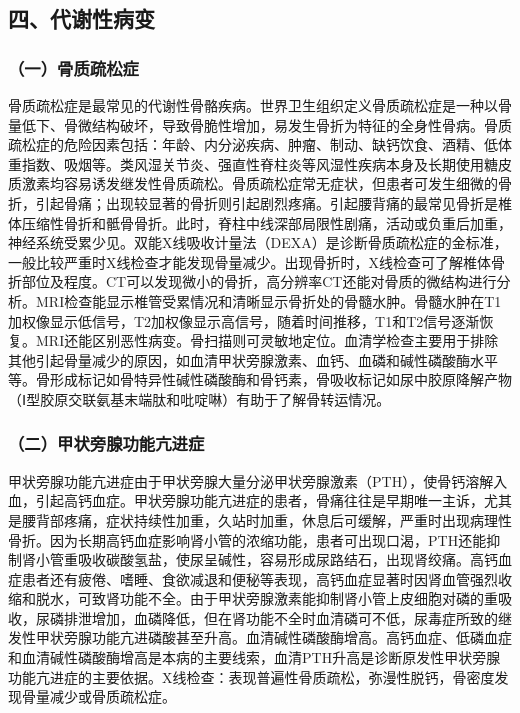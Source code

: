 \subsection{四、代谢性病变}

\subsubsection{（一）骨质疏松症}

骨质疏松症是最常见的代谢性骨骼疾病。世界卫生组织定义骨质疏松症是一种以骨量低下、骨微结构破坏，导致骨脆性增加，易发生骨折为特征的全身性骨病。骨质疏松症的危险因素包括：年龄、内分泌疾病、肿瘤、制动、缺钙饮食、酒精、低体重指数、吸烟等。类风湿关节炎、强直性脊柱炎等风湿性疾病本身及长期使用糖皮质激素均容易诱发继发性骨质疏松。骨质疏松症常无症状，但患者可发生细微的骨折，引起骨痛；出现较显著的骨折则引起剧烈疼痛。引起腰背痛的最常见骨折是椎体压缩性骨折和骶骨骨折。此时，脊柱中线深部局限性剧痛，活动或负重后加重，神经系统受累少见。双能X线吸收计量法（DEXA）是诊断骨质疏松症的金标准，一般比较严重时X线检查才能发现骨量减少。出现骨折时，X线检查可了解椎体骨折部位及程度。CT可以发现微小的骨折，高分辨率CT还能对骨质的微结构进行分析。MRI检查能显示椎管受累情况和清晰显示骨折处的骨髓水肿。骨髓水肿在T1加权像显示低信号，T2加权像显示高信号，随着时间推移，T1和T2信号逐渐恢复。MRI还能区别恶性病变。骨扫描则可灵敏地定位。血清学检查主要用于排除其他引起骨量减少的原因，如血清甲状旁腺激素、血钙、血磷和碱性磷酸酶水平等。骨形成标记如骨特异性碱性磷酸酶和骨钙素，骨吸收标记如尿中胶原降解产物（Ⅰ型胶原交联氨基末端肽和吡啶啉）有助于了解骨转运情况。

\subsubsection{（二）甲状旁腺功能亢进症}

甲状旁腺功能亢进症由于甲状旁腺大量分泌甲状旁腺激素（PTH），使骨钙溶解入血，引起高钙血症。甲状旁腺功能亢进症的患者，骨痛往往是早期唯一主诉，尤其是腰背部疼痛，症状持续性加重，久站时加重，休息后可缓解，严重时出现病理性骨折。因为长期高钙血症影响肾小管的浓缩功能，患者可出现口渴，PTH还能抑制肾小管重吸收碳酸氢盐，使尿呈碱性，容易形成尿路结石，出现肾绞痛。高钙血症患者还有疲倦、嗜睡、食欲减退和便秘等表现，高钙血症显著时因肾血管强烈收缩和脱水，可致肾功能不全。由于甲状旁腺激素能抑制肾小管上皮细胞对磷的重吸收，尿磷排泄增加，血磷降低，但在肾功能不全时血清磷可不低，尿毒症所致的继发性甲状旁腺功能亢进磷酸甚至升高。血清碱性磷酸酶增高。高钙血症、低磷血症和血清碱性磷酸酶增高是本病的主要线索，血清PTH升高是诊断原发性甲状旁腺功能亢进症的主要依据。X线检查：表现普遍性骨质疏松，弥漫性脱钙，骨密度发现骨量减少或骨质疏松症。

